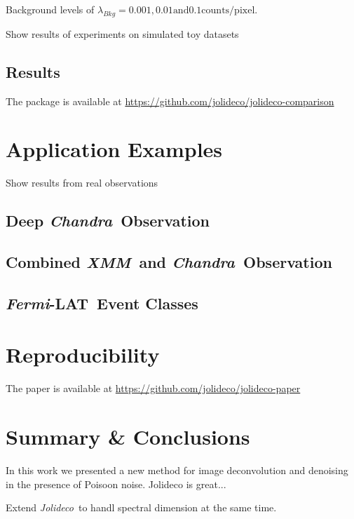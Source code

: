 \documentclass[twocolumn]{aastex631}
\newcommand{\chandra}{\textit{Chandra}~}
\newcommand{\xmm}{\textit{XMM}~}
\newcommand{\fermi}{\textit{Fermi}-LAT~}
\newcommand{\jolideco}{\textit{Jolideco}~}
\begin{document}
    Background levels of $\lambda_{Bkg}= 0.001, 0.01 \textrm{and} 0.1 \textrm{counts/pixel}$. 
    
    Show results of experiments on simulated toy datasets

    

    \subsection{Results}

    The package is available at \url{https://github.com/jolideco/jolideco-comparison}


    \section{Application Examples}
    Show results from real observations

    \subsection{Deep \chandra Observation}

    \subsection{Combined \xmm and \chandra Observation}

    \subsection{\fermi Event Classes}

    \section{Reproducibility}

    The paper is available at \url{https://github.com/jolideco/jolideco-paper}
    


    \section{Summary \& Conclusions}
    In this work we presented a new method for image deconvolution and denoising in the presence of Poisoon noise.
    Jolideco is great...

    Extend \jolideco to handl spectral dimension at the same time.
\end{document}
